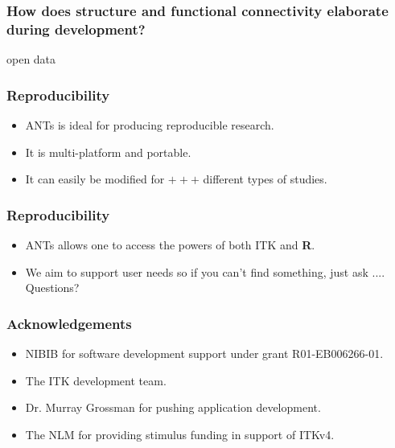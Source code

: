 \documentclass[18pt]{beamer}
\begin{document}
\begin{frame}
\frametitle{How does structure and functional connectivity elaborate during development?}
open data
\end{frame}


\begin{frame}
\frametitle{Reproducibility}
\Huge
\begin{itemize}
\item ANTs is ideal for producing reproducible research.
\pause
\item It is multi-platform and portable.
\pause
\item It can easily be modified for $+++$ different types of studies. 
\end{itemize}
\end{frame}

\begin{frame}
\frametitle{Reproducibility}
\Huge
\begin{itemize}
\item ANTs allows one to access the powers of both ITK and {\bf
    R}. 
\pause
\item We aim to support user needs so if you can't find something,
  just ask .... Questions?
\end{itemize}
\end{frame}

\begin{frame}
\frametitle{Acknowledgements}
\Large
\begin{itemize}
\item NIBIB for software development support under grant R01-EB006266-01.
\item The ITK development team.
\item Dr. Murray Grossman for pushing application development.
\item The NLM for providing stimulus funding in support of ITKv4. 
\end{itemize}
\end{frame}
\end{document}
